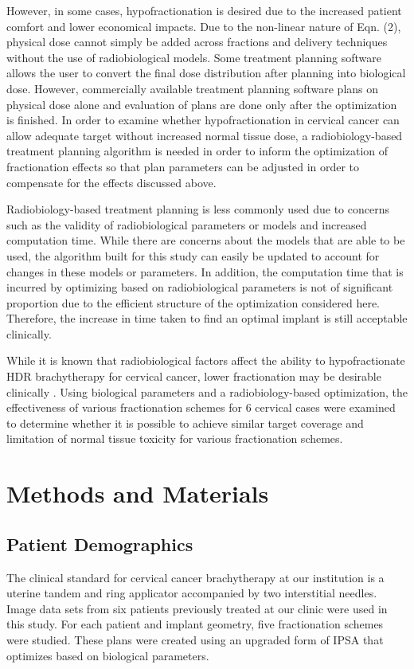 \documentclass[osajnl,twocolumn,showpacs,superscriptaddress,10pt]{revtex4-1}
\begin{document}
However, in some cases, hypofractionation is desired due to the increased patient comfort and lower economical impacts. Due to the non-linear nature of Eqn. (2), physical dose cannot simply be added across fractions and delivery techniques without the use of radiobiological models. Some treatment planning software allows the user to convert the final dose distribution after planning into biological dose. However, commercially available treatment planning software plans on physical dose alone and evaluation of plans are done only after the optimization is finished. In order to examine whether hypofractionation in cervical cancer can allow adequate target without increased normal tissue dose, a radiobiology-based treatment planning algorithm is needed in order to inform the optimization of fractionation effects so that plan parameters can be adjusted in order to compensate for the effects discussed above. 

Radiobiology-based treatment planning is less commonly used due to concerns such as the validity of radiobiological parameters or models and increased computation time. While there are concerns about the models that are able to be used, the algorithm built for this study can easily be updated to account for changes in these models or parameters. In addition, the computation time that is incurred by optimizing based on radiobiological parameters is not of significant proportion due to the efficient structure of the optimization considered here. Therefore, the increase in time taken to find an optimal implant is still acceptable clinically. 

While it is known that radiobiological factors affect the ability to hypofractionate HDR brachytherapy for cervical cancer, lower fractionation may be desirable clinically \cite{hypodesirable}. Using biological parameters and a radiobiology-based optimization, the effectiveness of various fractionation schemes for 6 cervical cases were examined to determine whether it is possible to achieve similar target coverage and limitation of normal tissue toxicity for various fractionation schemes.  

\section{Methods and Materials}

\subsection{Patient Demographics}
The clinical standard for cervical cancer brachytherapy at our institution is a uterine tandem and ring applicator accompanied by two interstitial needles. Image data sets from six patients previously treated at our clinic were used in this study. For each patient and implant geometry, five fractionation schemes were studied. These plans were created using an upgraded form of IPSA \cite{ipsa} that optimizes based on biological parameters.
\end{document}
